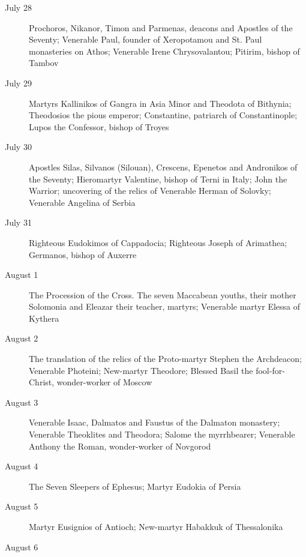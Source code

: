 \begin{description}
\item[July 28]

Prochoros, Nikanor, Timon and Parmenas, deacons and Apostles of the Seventy; Venerable Paul, founder of Xeropotamou and St. Paul monasteries on Athos; Venerable Irene Chrysovalantou; Pitirim, bishop of Tambov

\item[July 29]

Martyrs Kallinikos of Gangra in Asia Minor and Theodota of Bithynia; Theodosios the pious emperor; Constantine, patriarch of Constantinople; Lupos the Confessor, bishop of Troyes

\item[July 30]

Apostles Silas, Silvanos (Silouan), Crescens, Epenetos and Andronikos of the Seventy; Hieromartyr Valentine, bishop of Terni in Italy; John the Warrior; uncovering of the relics of Venerable Herman of Solovky; Venerable Angelina of Serbia

\item[July 31]

Righteous Eudokimos of Cappadocia; Righteous Joseph of Arimathea; Germanos, bishop of Auxerre

\item[August 1]

The Procession of the Cross. The seven Maccabean youths, their mother Solomonia and Eleazar their teacher, martyrs; Venerable martyr Elessa of Kythera

\item[August 2]

The translation of the relics of the Proto-martyr Stephen the Archdeacon; Venerable Photeini; New-martyr Theodore; Blessed Basil the fool-for-Christ, wonder-worker of Moscow

\item[August 3]

Venerable Isaac, Dalmatos and Faustus of the Dalmaton monastery; Venerable Theoklites and Theodora; Salome the myrrhbearer; Venerable Anthony the Roman, wonder-worker of Novgorod

\item[August 4]

The Seven Sleepers of Ephesus; Martyr Eudokia of Persia
\item[August 5]

Martyr Eusignios of Antioch; New-martyr Habakkuk of Thessalonika

\item[August 6]


\end{description}
